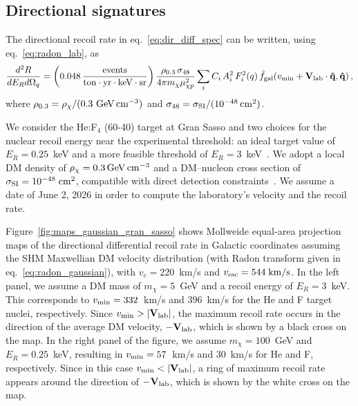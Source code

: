 \documentclass[a4paper,11pt]{article}
\begin{document}
\subsection{Directional signatures}
\label{sec:results_rate}


The directional recoil rate in  eq.~\eqref{eq:dir_diff_spec} can be written, using  eq.~\eqref{eq:radon_lab}, as
%
\begin{equation}
    \frac{d^2 R}{dE_R d\Omega_q} = \left(0.048\, \frac{\rm{events}}{\rm{ton}\cdot \rm{yr} \cdot \rm{keV}\cdot\rm{sr}}\right) \frac{\rho_{0.3}\, \sigma_{48}}{4\pi m_\chi \mu_{\chi p}^2} \sum_i C_i\, A_i^2\, F^2_i(q)\,  \hat{f}_{\rm{gal}}(v_{\rm min} + \bf{V}_{\rm{lab}}\cdot \hat{\bf{q}},\hat{\bf{q}})\,,
\end{equation}
%
where $\rho_{0.3}=\rho_\chi/(0.3~\rm{GeV}\,\rm{cm}^{-3})$ and  $\sigma_{48}=\sigma_{\rm SI}/(10^{-48}\,\rm{cm}^2)$.


We consider the He:F$_4$ (60-40) target at Gran Sasso and two choices for the nuclear recoil energy near the experimental threshold: an ideal target value of $E_R=0.25$~keV and a more feasible threshold of $E_R=3$~keV~\cite{Vahsen:2020pzb, Vahsen:2021gnb, Mazzitelli:2023tdr}. We adopt a local DM density of $\rho_\chi=0.3\, \rm{GeV}\,\rm{cm}^{-3}$ and a DM–nucleon cross section of $\sigma_{\rm SI}=10^{-48} \; \rm{cm}^2$, compatible with direct detection constraints~\cite{Baxter:2021pqo, LZ:2024zvo}. We assume a date of June 2, 2026 in order to compute the laboratory's velocity and the recoil rate.

Figure~\ref{fig:maps_gaussian_gran_sasso} shows Mollweide equal-area projection maps of the directional differential recoil rate in Galactic coordinates assuming the SHM Maxwellian DM velocity distribution (with Radon transform given in eq.~\eqref{eq:radon_gaussian}), 
with $v_c=220$~km/s 
and $v_{\rm{esc}} = 544\; \rm{km}/\rm{s}$. 
In the left panel,  
we assume a DM mass of $m_\chi =5$~GeV and a recoil energy of $E_R=3$~keV. This corresponds to $v_{\rm{min}}=332$~km/s and 396~km/s for the He and F target nuclei, respectively. Since $v_{\rm min}>|{\bf V}_{\rm lab}|$, the maximum recoil rate occurs in the direction of the average DM velocity, $-\mathbf{V}_{\rm{lab}}$, which is shown by a black cross on the map. In the right panel of the figure, we assume $m_\chi=100$~GeV and $E_R=0.25$~keV, resulting in $v_{\rm{min}}=57$~km/s and 30~km/s for He and F, respectively. Since in this case $v_{\rm min} < |\mathbf{V}_{\rm{lab}}|$, a ring of maximum recoil rate appears around the direction of $-\mathbf{V}_{\rm{lab}}$, which is shown by the white cross on the map.
\end{document}
